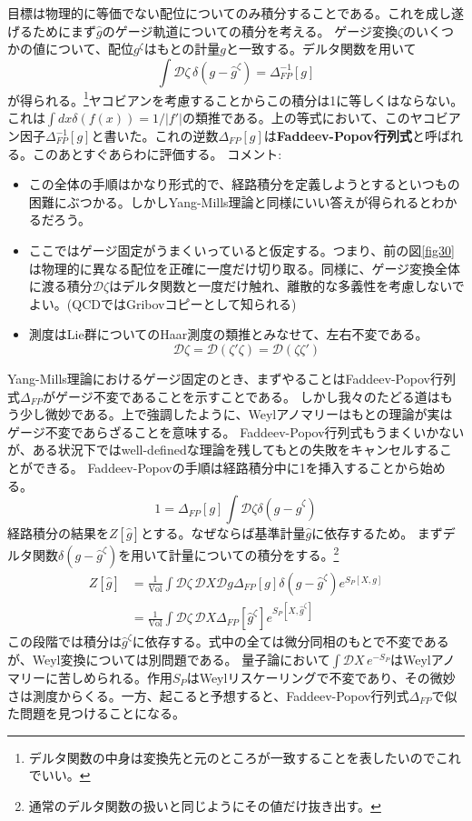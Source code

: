 \documentclass[10pt]{jsarticle}
\newcommand{\sint}[1]{\int\mathcal{D}#1\,}%
\begin{document}
目標は物理的に等価でない配位についてのみ積分することである。これを成し遂げるためにまず$\hat{g}$のゲージ軌道についての積分を考える。
ゲージ変換$\zeta$のいくつかの値について、配位$g^{\zeta}$はもとの計量$g$と一致する。デルタ関数を用いて
\begin{equation}
 \label{5.1} \int \mathcal{D}\zeta \,\delta(g-\hat{g}^{\zeta})=\Delta^{-1}_{FP}[g]
\end{equation}
が得られる。\footnote{デルタ関数の中身は変換先と元のところが一致することを表したいのでこれでいい。}ヤコビアンを考慮することからこの積分は1に等しくはならない。
これは$\int dx\delta(f(x))=1/|f'|$の類推である。上の等式において、このヤコビアン因子$\Delta^{-1}_{FP}[g]$と書いた。これの逆数$\Delta_{FP}[g]$は{\bf Faddeev-Popov行列式}と呼ばれる。このあとすぐあらわに評価する。
コメント:
\begin{itemize}
  \item この全体の手順はかなり形式的で、経路積分を定義しようとするといつもの困難にぶつかる。しかしYang-Mills理論と同様にいい答えが得られるとわかるだろう。
  \item ここではゲージ固定がうまくいっていると仮定する。つまり、前の図\ref{fig30}は物理的に異なる配位を正確に一度だけ切り取る。同様に、ゲージ変換全体に渡る積分$\mathcal{D}\zeta$はデルタ関数と一度だけ触れ、離散的な多義性を考慮しないでよい。(QCDではGribovコピーとして知られる)
  \item 測度はLie群についてのHaar測度の類推とみなせて、左右不変である。
  \begin{equation}
    \mathcal{D}\zeta=\mathcal{D}(\zeta'\zeta)=\mathcal{D}(\zeta\zeta')
  \end{equation}
\end{itemize}
Yang-Mills理論におけるゲージ固定のとき、まずやることはFaddeev-Popov行列式$\Delta_{FP}$がゲージ不変であることを示すことである。
しかし我々のたどる道はもう少し微妙である。上で強調したように、Weylアノマリーはもとの理論が実はゲージ不変であらざることを意味する。
Faddeev-Popov行列式もうまくいかないが、ある状況下ではwell-definedな理論を残してもとの失敗をキャンセルすることができる。
Faddeev-Popovの手順は経路積分中に1を挿入することから始める。
\begin{equation}
  1=\Delta_{FP}[g]\int \mathcal{D}\zeta \delta(g-\hat{g}^{\zeta})
\end{equation}
経路積分の結果を$Z[\hat{g}]$とする。なぜならば基準計量$\hat{g}$に依存するため。
まずデルタ関数$\delta(g-\hat{g}^{\zeta})$を用いて計量についての積分をする。\footnote{通常のデルタ関数の扱いと同じようにその値だけ抜き出す。}
\begin{align}
  Z[\hat{g}]&=\frac{1}{\mathrm{Vol}}\sint{\zeta}\mathcal{D}X\mathcal{D}g\Delta_{FP}[g]\delta(g-\hat{g}^{\zeta})e^{S_{P}[X,g]}\\
  \label{5.2}&=\frac{1}{\mathrm{Vol}}\sint{\zeta}\mathcal{D}X\Delta_{FP}[\hat{g}^{\zeta}]e^{S_{P}[X,\hat{g}^{\zeta}]}
\end{align}
この段階では積分は$\hat{g}^{\zeta}$に依存する。式中の全ては微分同相のもとで不変であるが、Weyl変換については別問題である。
量子論において$\sint{X}e^{-S_{P}}$はWeylアノマリーに苦しめられる。作用$S_{P}$はWeylリスケーリングで不変であり、その微妙さは測度からくる。一方、起こると予想すると、Faddeev-Popov行列式$\Delta_{FP}$で似た問題を見つけることになる。
\end{document}
